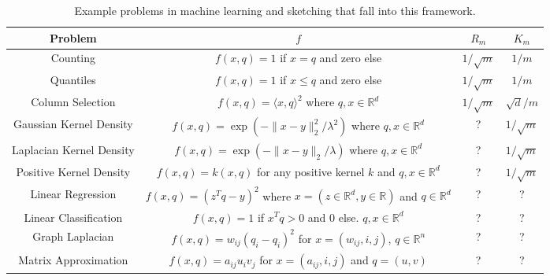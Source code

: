 \documentclass[anon,12pt]{colt2019} %
\newcommand{\R}{\mathbb{R}}
\begin{document}
\newcommand{\ccc}[1]{\parbox}
\begin{table}[htp]
\begin{center}
\begin{tabular}{|c|c|c|c|} \hline
Problem				& $f$ 											& $R_m$ 			& $K_m$ \\ \hline
Counting 				& $f(x, q) = 1$ if $x=q$ and zero else 					& $1/\sqrt{m}$		& $1/m$ \\ \hline
Quantiles				& $f(x, q) = 1$ if $x\le q$ and zero else  					& $1/\sqrt{m}$		& $1/m$ \\ \hline
Column Selection		& $f(x, q) = \langle x,q \rangle ^2$ where  $q,x\in \R^d$		& $1/\sqrt{m}$		& $\sqrt{d}/m$ \\ \hline
Gaussian Kernel Density 			& $f(x, q) = \exp(- \|x-y\|_2^2/\lambda^2)$ where  $q,x\in \R^d$				& ? 		& $1/\sqrt{m}$ \\ \hline
Laplacian Kernel Density 			& $f(x, q) = \exp(- \|x-y\|_2/\lambda)$ where  $q,x\in \R^d$				& ? 		& $1/\sqrt{m}$ \\ \hline
Positive Kernel Density 			& $f(x, q) = k(x,q)$ for any positive kernel $k$ and $q,x\in \R^d$				& ? 		& $1/\sqrt{m}$ \\ \hline

Linear Regression		& $f(x,q) = (z^Tq - y)^2$ where $x = (z\in\R^d,y\in \R)$ and $q\in \R^d$					& ?				& ? \\ \hline
Linear Classification		& $f(x,q) = 1$ if $x^Tq > 0$ and $0$ else. $q,x\in \R^d$					& ?				& ? \\ \hline
Graph Laplacian 		& $f(x, q) = w_{ij}(q_i - q_i)^2$ for $x = (w_{ij},i,j)$, $q \in \R^n$ & ?				& ? \\ \hline
Matrix Approximation  	& $f(x, q) = a_{ij}u_iv_j$ for $x = (a_{ij},i,j)$  and $q = (u,v)$ 	& ?				& ? \\ \hline
\end{tabular}
\caption{Example problems in machine learning and sketching that fall into this framework.}
\end{center}
\label{default}
\end{table}%
\end{document}
